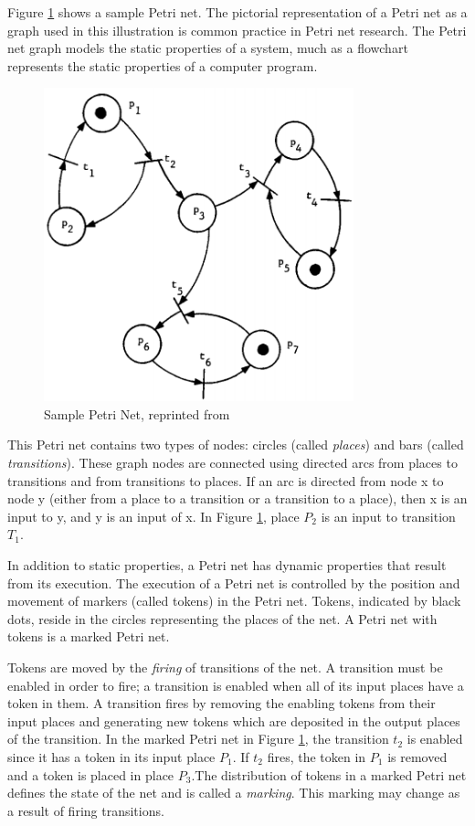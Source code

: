 Figure \ref{fig:pn} shows a sample Petri net. The pictorial representation of a Petri net as a graph used in this illustration is common practice in Petri net research. The Petri net graph models the static properties of a system, much as a flowchart represents the static properties of a computer program. 

\begin{figure}[h]
	\centering
	\includegraphics[width=0.8\textwidth]{./figs/petri_net}
	\caption{Sample Petri Net, reprinted from \cite{peterson1977petri}}
	\label{fig:pn}
\end{figure}

This Petri net contains two types of nodes: circles (called \emph{places}) and bars (called \emph{transitions}). These graph nodes are connected using directed arcs from places to transitions and from transitions to places. If an arc is directed from node x to node y (either from a place to a transition or a transition to a place), then x is an input to y, and y is an input of x. In Figure \ref{fig:pn}, place $P_2$ is an input to transition $T_1$. 

In addition to static properties, a Petri net has dynamic properties that result from its execution. The execution of a Petri net is controlled by the position and movement of markers (called tokens) in the Petri net. Tokens, indicated by black dots, reside in the circles representing the places of the net. A Petri net with tokens is a marked Petri net. 

Tokens are moved by the \emph{firing} of transitions of the net. A transition must be enabled in order to fire; a transition is enabled when all of its input places have a token in them. A transition fires by removing the enabling tokens from their input places and generating new tokens which are deposited in the output places of the transition. In the marked Petri net in Figure \ref{fig:pn}, the transition $t_2$ is enabled since it has a token in its input place $P_1$. If $t_2$ fires, the token in $P_1$ is removed and a token is placed in place $P_3$.The distribution of tokens in a marked Petri net defines the state of the net and is called a \emph{marking}. This marking may change as a result of firing transitions. 

